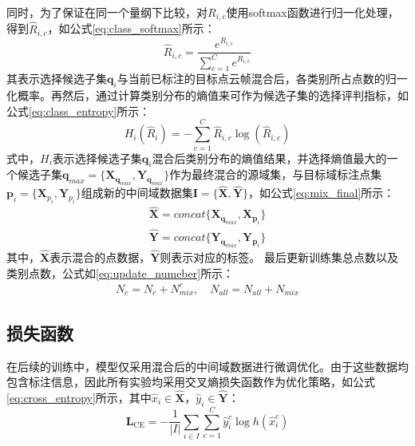     同时，为了保证在同一个量纲下比较，对$R_{i,c}$使用softmax函数进行归一化处理，得到$\hat{R}_{i,c}$，如公式\eqref{eq:class_softmax}所示：
    \begin{equation}
        \label{eq:class_softmax}
        \hat{R}_{i,c}=\frac{e^{R_{i,c}}}{\sum^C_{c=1}e^{R_{i,c}}}
    \end{equation}
    其表示选择候选子集$\mathbf{q}_i$与当前已标注的目标点云帧混合后，各类别所占点数的归一化概率。再然后，通过计算类别分布的熵值来可作为候选子集的选择评判指标，如公式\eqref{eq:class_entropy}所示：
    \begin{equation}
        \label{eq:class_entropy}
        H_i(\hat{R}_{i})=-\sum_{c=1}^{C} \hat{R}_{i,c}\log(\hat{R}_{i,c})
    \end{equation}
    式中，$H_i$表示选择候选子集$\mathbf{q}_i$混合后类别分布的熵值结果，并选择熵值最大的一个候选子集$\mathbf{q}_{max}=\{\mathbf{X}_{\mathbf{q}_{max}},\mathbf{Y}_{\mathbf{q}_{max}}\}$作为最终混合的源域集，与目标域标注点集$\mathbf{p}_i=\{\mathbf{X}_{p_i},\mathbf{Y}_{p_i}\}$组成新的中间域数据集$\mathbf{I}=\{\mathbf{\hat{X},\hat{Y}}\}$，如公式\eqref{eq:mix_final}所示：
    \begin{equation}
        \label{eq:mix_final}
        \begin{aligned}
            \mathbf{\hat{X}}=concat\{\mathbf{X}_{\mathbf{q}_{max}},\mathbf{X}_{\mathbf{p}_i}\}
            \\
        \mathbf{\hat{Y}}=concat\{\mathbf{Y}_{\mathbf{q}_{max}},\mathbf{Y}_{\mathbf{p}_i}\}
        \end{aligned}
    \end{equation}
    其中，$\mathbf{\hat{X}}$表示混合的点数据，$\mathbf{\hat{Y}}$则表示对应的标签。%
    最后更新训练集总点数以及类别点数，公式如\eqref{eq:update_numeber}所示：
    \begin{equation}
        \label{eq:update_numeber}
        \begin{aligned}
            N_c=N_c+N^c_{mix}, \quad
            N_{all}=N_{all}+N_{mix}
        \end{aligned}
    \end{equation}
    
    \subsection{损失函数}
    在后续的训练中，模型仅采用混合后的中间域数据进行微调优化。由于这些数据均包含标注信息，因此所有实验均采用交叉熵损失函数作为优化策略，如公式\eqref{eq:cross_entropy}所示，其中$\hat{x}_{i} \in \hat{\mathbf{X}}$，$\hat{y}_{i} \in \hat{\mathbf{Y}}$：
    \begin{equation}
        \label{eq:cross_entropy}
        \mathbf{L}_{\text{CE}} = - \frac{1}{|I|} \sum_{i \in I} \sum_{c=1}^{C} \hat{y}_{i}^{c} \log h(\hat{x}_{i}^{c})
    \end{equation}

